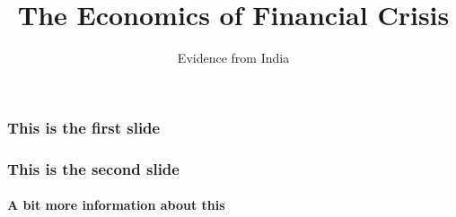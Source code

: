 \documentclass[mathserif,serif]{beamer}
\begin{document}
\title[Crisis] %
{The Economics of Financial Crisis}
\subtitle{Evidence from India}


  \begin{frame}
    \frametitle{This is the first slide}
  \end{frame}
  \begin{frame}
    \frametitle{This is the second slide}
    \framesubtitle{A bit more information about this}
  \end{frame}
\end{document}
